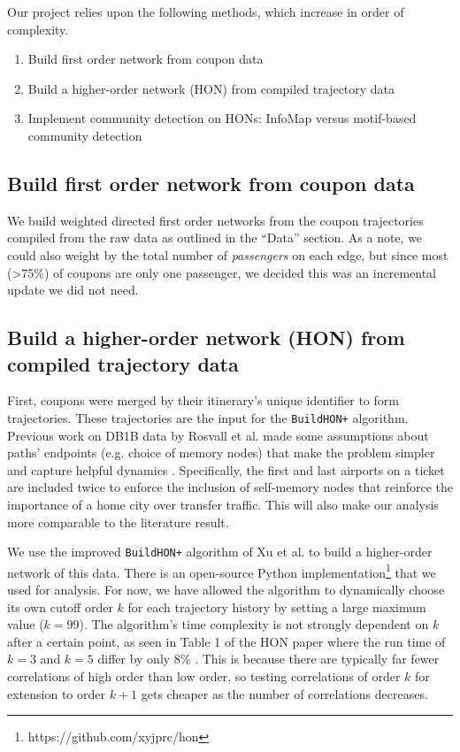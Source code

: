 \documentclass[sigconf]{acmart}
\begin{document}
Our project relies upon the following methods, which increase in order of complexity.

\begin{enumerate}
    \item Build first order network from coupon data 
    \item Build a higher-order network (HON) from compiled trajectory data
    \item Implement community detection on HONs: InfoMap versus motif-based community detection
\end{enumerate}

\subsection{Build first order network from coupon data}
We build weighted directed first order networks from the coupon trajectories compiled from the raw data as outlined in the ``Data'' section. As a note, we could also weight by the total number of \textit{passengers} on each edge, but since most (>75\%) of coupons are only one passenger, we decided this was an incremental update we did not need.

\subsection{Build a higher-order network (HON) from compiled trajectory data}
First, coupons were merged by their itinerary's unique identifier to form trajectories. These trajectories are the input for the \texttt{BuildHON+} algorithm. Previous work on DB1B data by Rosvall et al. made some assumptions about paths' endpoints (e.g. choice of memory nodes) that make the problem simpler and capture helpful dynamics \cite{Rosvall2014}. Specifically, the first and last airports on a ticket are included twice to enforce the inclusion of self-memory nodes that reinforce the importance of a home city over transfer traffic. This will also make our analysis more comparable to the literature result.

We use the improved \texttt{BuildHON+} algorithm of Xu et al. \cite{Xu2017} to build a higher-order network of this data. There is an open-source Python implementation\footnote{https://github.com/xyjprc/hon} that we used for analysis\cite{Xu2016,Xu2017}. For now, we have allowed the algorithm to dynamically choose its own cutoff order $k$ for each trajectory history by setting a large maximum value ($k = 99$). The algorithm's time complexity is not strongly dependent on $k$ after a certain point, as seen in Table 1 of the HON paper where the run time of $k = 3$ and $k = 5$ differ by only 8\% \cite{Xu2016}. This is because there are typically far fewer correlations of high order than low order, so testing correlations of order $k$ for extension to order $k+1$ gets cheaper as the number of correlations decreases.
\end{document}
